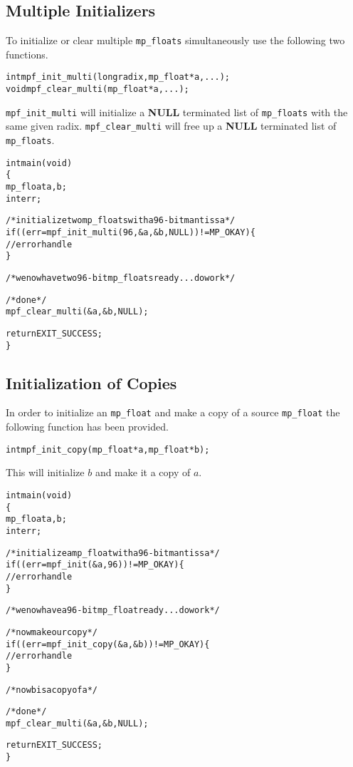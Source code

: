 \documentclass[a4paper]{book}
\theoremstyle{definition}
\theoremstyle{remark}
\begin{document}
\subsection{Multiple Initializers}

To initialize or clear multiple {\texttt{mp\_floats}} simultaneously use the following two functions.

 
\begin{alltt}
int  mpf_init_multi(long radix, mp_float *a, ...);
void mpf_clear_multi(mp_float *a, ...);
\end{alltt}

{\texttt{mpf\_init\_multi}} will initialize a \textbf{NULL} terminated list of {\texttt{mp\_floats}} with the same given radix.  {\texttt{mpf\_clear\_multi}} will free up a \textbf{NULL} terminated list of {\texttt{mp\_floats}}.

\begin{alltt}
int main(void)
\{
   mp_float a, b;
   int err;

   /* initialize two mp_floats with a 96-bit mantissa */
   if ((err = mpf_init_multi(96, &a, &b, NULL)) != MP_OKAY) \{
      // error handle
   \}

   /* we now have two 96-bit mp_floats ready ... do work */

   /* done */
   mpf_clear_multi(&a, &b, NULL);

   return EXIT_SUCCESS;
\}
\end{alltt}

\subsection{Initialization of Copies}

In order to initialize an {\texttt{mp\_float}} and make a copy of a source {\texttt{mp\_float}} the following function has been provided.

\begin{alltt}
int  mpf_init_copy(mp_float *a, mp_float *b);
\end{alltt}

This will initialize $b$ and make it a copy of $a$.  

\begin{alltt}
int main(void)
\{
   mp_float a, b;
   int err;

   /* initialize a mp_float with a 96-bit mantissa */
   if ((err = mpf_init(&a, 96)) != MP_OKAY) \{
      // error handle
   \}

   /* we now have a 96-bit mp_float ready ... do work */

   /* now make our copy */
   if ((err = mpf_init_copy(&a, &b)) != MP_OKAY) \{
      // error handle
   \}

   /* now b is a copy of a */

   /* done */
   mpf_clear_multi(&a, &b, NULL);

   return EXIT_SUCCESS;
\}
\end{alltt}
\end{document}
